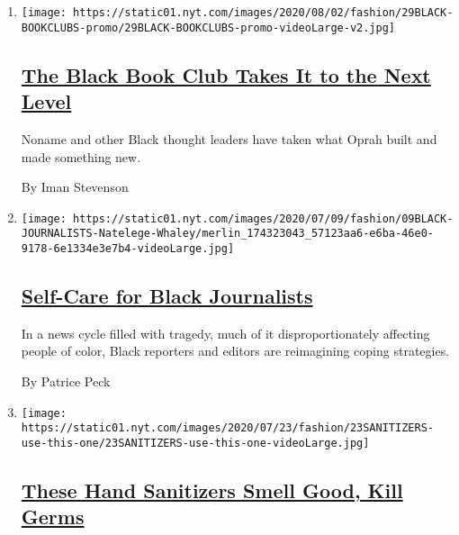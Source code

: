\begin{enumerate}
\def\labelenumi{\arabic{enumi}.}
\item
  \texttt{[image: https://static01.nyt.com/images/2020/08/02/fashion/29BLACK-BOOKCLUBS-promo/29BLACK-BOOKCLUBS-promo-videoLarge-v2.jpg]}

  \hypertarget{the-black-book-club-takes-it-to-the-next-level}{%
  \subsection{\texorpdfstring{\href{/2020/07/29/style/self-care/black-book-clubs.html}{The
  Black Book Club Takes It to the Next
  Level}}{The Black Book Club Takes It to the Next Level}}\label{the-black-book-club-takes-it-to-the-next-level}}

  Noname and other Black thought leaders have taken what Oprah built and
  made something new.

  By Iman Stevenson
\item
  \texttt{[image: https://static01.nyt.com/images/2020/07/09/fashion/09BLACK-JOURNALISTS-Natelege-Whaley/merlin\_174323043\_57123aa6-e6ba-46e0-9178-6e1334e3e7b4-videoLarge.jpg]}

  \hypertarget{self-care-for-black-journalists}{%
  \subsection{\texorpdfstring{\href{/2020/07/14/style/self-care/black-journalists.html}{Self-Care
  for Black
  Journalists}}{Self-Care for Black Journalists}}\label{self-care-for-black-journalists}}

  In a news cycle filled with tragedy, much of it disproportionately
  affecting people of color, Black reporters and editors are reimagining
  coping strategies.

  By Patrice Peck
\item
  \texttt{[image: https://static01.nyt.com/images/2020/07/23/fashion/23SANITIZERS-use-this-one/23SANITIZERS-use-this-one-videoLarge.jpg]}

  \hypertarget{these-hand-sanitizers-smell-good-kill-germs}{%
  \subsection{\texorpdfstring{\href{/2020/07/22/style/these-hand-sanitizers-smell-good-kill-germs.html}{These
  Hand Sanitizers Smell Good, Kill
  Germs}}{These Hand Sanitizers Smell Good, Kill Germs}}\label{these-hand-sanitizers-smell-good-kill-germs}}


\end{enumerate}
